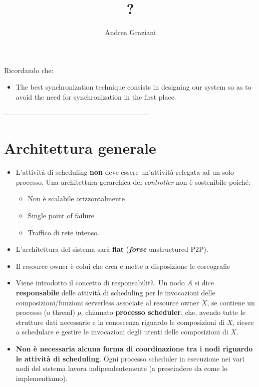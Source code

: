 \documentclass[10pt,a4paper]{report}
\author{Andrea Graziani}
\title{?}
\begin{document}
Ricordando che:

\begin{itemize}
\item The best synchronization technique consists in designing our system so as to avoid
the need for synchronization in the first place.
\end{itemize}

--------------------------------------------------------------

\section{Architettura generale}

\begin{itemize}
\item L'attività di scheduling \textbf{non} deve essere un'attività relegata ad un solo processo. Una architettura gerarchica del \textit{controller} non è sostenibile poiché:

\begin{itemize}
\item Non è scalabile orizzontalmente
\item Single point of failure
\item Traffico di rete intenso.
\end{itemize}



\item L'architettura del sistema sarà \textbf{flat} (\textbf{\textit{forse}} unstructured P2P).

\item Il resource owner è colui che crea e mette a disposizione le coreografie

\item Viene introdotto il concetto di responsabilità. Un nodo $A$ si dice \textbf{responsabile} delle attività di scheduling per le invocazioni delle composizioni/funzioni serverless associate al resource owner $X$, se contiene un processo (o thread) $p$, chiamato \textbf{processo scheduler}, che, avendo tutte le strutture dati necessarie e la conoscenza riguardo le composizioni di $X$, riesce a schedulare e gestire le invocazioni degli utenti delle composizioni di $X$.

\item \textbf{Non è necessaria alcuna forma di coordinazione tra i nodi riguardo le attività di scheduling}. Ogni processo scheduler in esecuzione nei vari nodi del sistema lavora indipendentemente (a prescindere da come lo implementiamo). 


\end{itemize}
\end{document}
